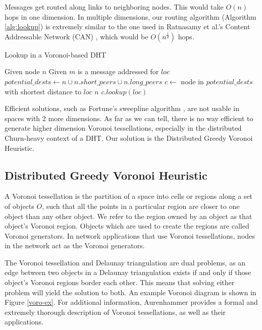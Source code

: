 Messages get routed along links to neighboring nodes. 
This would take $O(n)$ hops in one dimension.
In multiple dimensions, our routing algorithm (Algorithm \ref{alg:lookup}) is extremely similar to the one used in Ratnasamy et al.'s Content Addressable Network (CAN) \cite{can}, which would be $O(n^{\frac{1}{d}})$ hops.


\begin{algorithm}
	\caption{Lookup in a Voronoi-based DHT}
	\label{alg:lookup}
	\begin{algorithmic}[1] 
		\State Given node $n$
		\State Given $m$ is a message addressed for $loc$
		\State $potential\_dests \leftarrow n \cup n.short\_peers \cup n.long\_peers$
		\State $c \leftarrow $ node in $ potential\_dests$ with shortest distance to $loc$
			\State \Return $n$
		\Else 
			\State \Return $c.lookup(loc)$
		\EndIf
	\end{algorithmic}
\end{algorithm}


Efficient solutions, such as Fortune's sweepline algorithm \cite{fortune1987sweepline}, are not usable in spaces with 2 more dimensions.
As far as we can tell, there is no way efficient to generate higher dimension Voronoi tessellations, especially in the distributed Churn-heavy context of a DHT.
Our solution is the Distributed Greedy Voronoi Heuristic.

\subsection*{Distributed Greedy Voronoi Heuristic}
A Voronoi tessellation is the partition of a space into cells or regions along a set of objects $O$, such that all the points in a particular region are closer to one object than any other object.  
We refer to the region owned by an object as that object's Voronoi region.
Objects which are used to create the regions are called Voronoi generators.
In network applications that use Voronoi tessellations, nodes in the network act as the Voronoi generators.

The Voronoi tessellation and Delaunay triangulation are dual problems, as an edge between two objects in a Delaunay triangulation exists if and only if those object's Voronoi regions border each other.  
This means that solving either problem will yield the solution to both.   
An example Voronoi diagram is shown in Figure \ref{voro-ex}.
For additional information, Aurenhammer \cite{voronoi} provides a formal and extremely thorough description of Voronoi tessellations, as well as their applications.


